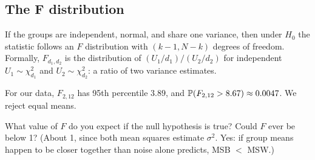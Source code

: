 \subsection{The F distribution}

If the groups are independent, normal, and share one variance, then under
$H_0$ the statistic follows an $F$ distribution with $(k-1, N-k)$ degrees of
freedom. Formally, $F_{d_1,d_2}$ is the distribution of
$(U_1/d_1)/(U_2/d_2)$ for independent $U_1\sim\chi^2_{d_1}$ and
$U_2\sim\chi^2_{d_2}$: a ratio of two variance estimates.

For our data, $F_{2,12}$ has 95th percentile $3.89$, and
$\P(F_{2,12} > 8.67) \approx 0.0047$. We reject equal means.

\begin{recoverybox}
What value of $F$ do you expect if the null hypothesis is
true? Could $F$ ever be below 1? (About 1, since both mean squares estimate
$\sigma^2$. Yes: if group means happen to be closer together than noise alone
predicts, MSB $<$ MSW.)
\end{recoverybox}

